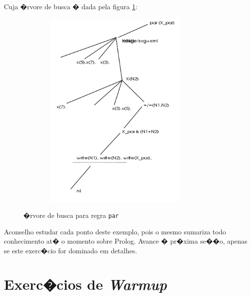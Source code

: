 \documentclass[final,a4paper]{article}
\begin{document}
Cuja �rvore de busca � dada pela figura \ref{fig_arv_prova_exemplo}:

\begin{figure}[!htb]
\centering
\includegraphics[height=10cm, width=10cm]{figuras/arv_prova_exemplo.pdf}
\label{fig_arv_prova_exemplo}
\caption{�rvore de busca  para regra {\tt par}}
\end{figure}

 Aconselho estudar cada ponto deste exemplo, pois o mesmo
sumariza todo conhecimento at� o momento sobre Prolog.
Avance � pr�xima se��o, apenas se este exerc�cio for dominado
em detalhes. 



\section{Exerc�cios de {\em Warmup}}
\end{document}
